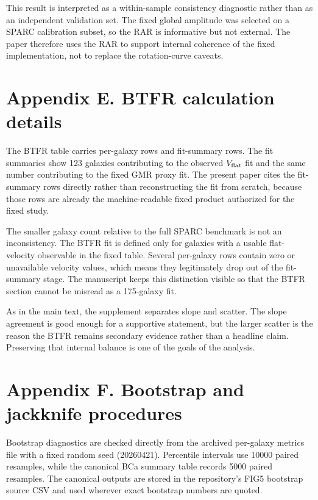 \documentclass[twocolumn,linenumbers]{aastex701}
\begin{document}
This result is interpreted as a within-sample consistency diagnostic rather than as an independent validation set. The fixed global amplitude was selected on a SPARC calibration subset, so the RAR is informative but not external. The paper therefore uses the RAR to support internal coherence of the fixed implementation, not to replace the rotation-curve caveats.



\section{Appendix E. BTFR calculation details}

The BTFR table carries per-galaxy rows and fit-summary rows. The fit summaries show 123 galaxies contributing to the observed $V_{\rm flat}$ fit and the same number contributing to the fixed GMR proxy fit. The present paper cites the fit-summary rows directly rather than reconstructing the fit from scratch, because those rows are already the machine-readable fixed product authorized for the fixed study.

The smaller galaxy count relative to the full SPARC benchmark is not an inconsistency. The BTFR fit is defined only for galaxies with a usable flat-velocity observable in the fixed table. Several per-galaxy rows contain zero or unavailable velocity values, which means they legitimately drop out of the fit-summary stage. The manuscript keeps this distinction visible so that the BTFR section cannot be misread as a 175-galaxy fit.

As in the main text, the supplement separates slope and scatter. The slope agreement is good enough for a supportive statement, but the larger scatter is the reason the BTFR remains secondary evidence rather than a headline claim. Preserving that internal balance is one of the goals of the analysis.
\section{Appendix F. Bootstrap and jackknife procedures}

Bootstrap diagnostics are checked directly from the archived per-galaxy metrics file with a fixed random seed (20260421). Percentile intervals use 10000 paired resamples, while the canonical BCa summary table records 5000 paired resamples. The canonical outputs are stored in the repository's FIG5 bootstrap source CSV and used wherever exact bootstrap numbers are quoted.
\end{document}
